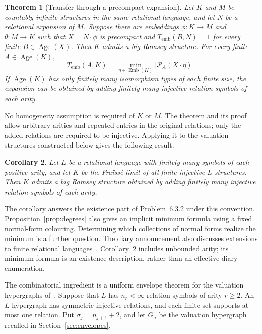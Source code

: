 \documentclass{article}
\numberwithin{equation}{section}
\newtheorem{theorem}{Theorem}[section]
\newtheorem{corollary}[theorem]{Corollary}
\theoremstyle{definition}
\DeclareMathOperator{\Emb}{Emb}
\DeclareMathOperator{\Age}{Age}
\newcommand{\brd}{T_{\mathrm{emb}}}
\begin{document}
\begin{theorem}[Transfer through a precompact expansion]\label{thm:transfer}
Let $K$ and $M$ be countably infinite structures in the same relational
language, and let $N$ be a relational expansion of $M$. Suppose there
are embeddings $\phi:K\to M$ and $\theta:M\to K$ such that
$X=N\cdot\phi$ is precompact and $\brd(B,N)=1$ for every finite
$B\in\Age(X)$. Then $K$ admits a big Ramsey structure. For every finite
$A\in\Age(K)$,
\begin{equation}\label{eq:transfer-min}
\brd(A,K)=\min_{\eta\in\Emb(K)}|\mathcal P_A(X\cdot\eta)|.
\end{equation}
If $\Age(K)$ has only finitely many isomorphism types of each finite size,
the expansion can be obtained by adding finitely many injective relation
symbols of each arity.
\end{theorem}

No homogeneity assumption is required of $K$ or $M$. The theorem and its
proof allow arbitrary arities and repeated entries in the original
relations; only the added relations are required to be injective.
Applying it to the valuation structures constructed below gives the
following result.

\begin{corollary}\label{thm:brs}
Let $L$ be a relational language with finitely many symbols of each
positive arity, and let $K$ be the Fra\"iss\'e limit of all finite
injective $L$-structures. Then $K$ admits a big Ramsey structure obtained
by adding finitely many injective relation symbols of each arity.
\end{corollary}

The corollary answers the existence part of Problem~6.3.2 under this
convention. Proposition~\ref{prop:degrees} also gives an implicit minimum
formula using a fixed normal-form colouring. Determining which collections
of normal forms realize the minimum is a further question.
The diary announcement also discusses extensions to finite relational
languages~\cite[Section~4]{TernaryDiaries}. Corollary~\ref{thm:brs}
includes unbounded arity; its minimum formula is an existence description,
rather than an effective diary enumeration.

The combinatorial ingredient is a uniform envelope theorem for the
valuation hypergraphs of~\cite[Definition~3.1]{InfiniteLanguages}. Suppose that
$L$ has $n_r<\infty$ relation symbols of arity $r\geq2$. An
$L$-hypergraph has symmetric injective relations, and each finite set
supports at most one relation. Put $\sigma_j=n_{j+1}+2$, and let
$G_\sigma$ be the valuation hypergraph recalled in
Section~\ref{sec:envelopes}.
\end{document}
